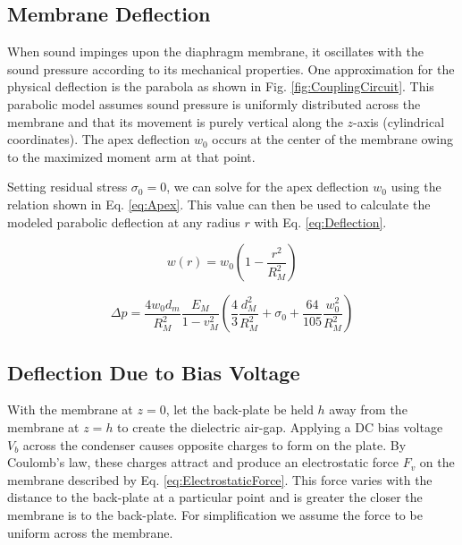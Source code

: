 \documentclass[journal]{IEEEtran}
\begin{document}
\subsection{Membrane Deflection}

When sound impinges upon the diaphragm membrane, it oscillates with the sound pressure according to its mechanical properties. One  approximation for the physical deflection is the parabola as shown in Fig. \ref{fig:CouplingCircuit}. This parabolic model assumes sound pressure is uniformly distributed across the membrane and that its movement is purely vertical along the $z$-axis (cylindrical coordinates). The apex deflection $w_0$ occurs at the center of the membrane owing to the maximized moment arm at that point.

Setting residual stress $\sigma_0=0$, we can solve for the apex deflection $w_0$ using the relation shown in Eq. \ref{eq:Apex}.\supercite{schomburg} This value can then be used to calculate the modeled parabolic deflection at any radius $r$ with Eq. \ref{eq:Deflection}.

\begin{figure}[ht]
	\begin{equation}
		w(r) = w_0\left(1-\frac{r^2}{R_M^2}\right)
		\label{eq:Deflection}
	\end{equation}
	
	\begin{equation}
		\Delta p = \frac{4w_0 d_m}{R_M^2} \frac{E_M}{1-v_M^2} \left( \frac{4}{3} \frac{d_M^2}{R_M^2} + \sigma_0 + \frac{64}{105} \frac{w_0^2}{R_M^2} \right)
		\label{eq:Apex}
	\end{equation}
\end{figure}


\subsection{Deflection Due to Bias Voltage}

With the membrane at $z=0$, let the back-plate be held $h$ away from the membrane at $z=h$ to create the dielectric air-gap. Applying a DC bias voltage $V_b$ across the condenser causes opposite charges to form on the plate. By Coulomb's law, these charges attract and produce an electrostatic force $F_v$ on the membrane described by Eq. \ref{eq:ElectrostaticForce}.\supercite{aip} This force varies with the distance to the back-plate at a particular point and is greater the closer the membrane is to the back-plate. For simplification we assume the force to be uniform across the membrane.
\end{document}
